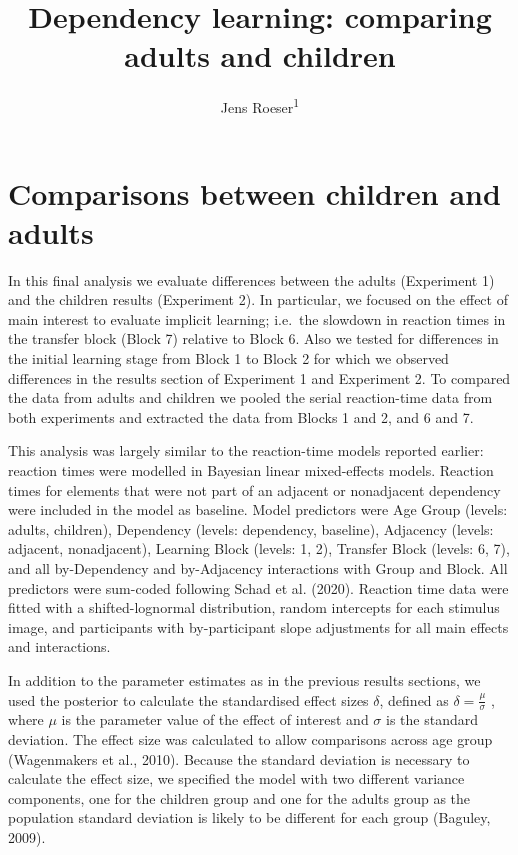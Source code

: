 \documentclass[
  english,
  man,floatsintext]{apa7}
\author{Jens Roeser\textsuperscript{1}}
\affiliation{
\vspace{0.5cm}
\textsuperscript{1} Department of Psychology, Nottingham Trent University, United Kingdom}
\title{Dependency learning: comparing adults and children}
\date{}
\begin{document}
\maketitle

\hypertarget{comparisons-between-children-and-adults}{%
\section{Comparisons between children and adults}\label{comparisons-between-children-and-adults}}

In this final analysis we evaluate differences between the adults (Experiment 1) and the children results (Experiment 2). In particular, we focused on the effect of main interest to evaluate implicit learning; i.e.~the slowdown in reaction times in the transfer block (Block 7) relative to Block 6. Also we tested for differences in the initial learning stage from Block 1 to Block 2 for which we observed differences in the results section of Experiment 1 and Experiment 2. To compared the data from adults and children we pooled the serial reaction-time data from both experiments and extracted the data from Blocks 1 and 2, and 6 and 7.

This analysis was largely similar to the reaction-time models reported earlier: reaction times were modelled in Bayesian linear mixed-effects models. Reaction times for elements that were not part of an adjacent or nonadjacent dependency were included in the model as baseline. Model predictors were Age Group (levels: adults, children), Dependency (levels: dependency, baseline), Adjacency (levels: adjacent, nonadjacent), Learning Block (levels: 1, 2), Transfer Block (levels: 6, 7), and all by-Dependency and by-Adjacency interactions with Group and Block. All predictors were sum-coded following Schad et al. (2020). Reaction time data were ﬁtted with a shifted-lognormal distribution, random intercepts for each stimulus image, and participants with by-participant slope adjustments for all main effects and interactions.

In addition to the parameter estimates as in the previous results sections, we used the posterior to calculate the standardised effect sizes \(\delta\), defined as \(\delta = \frac{\mu}{\sigma}\) , where \(\mu\) is the parameter value of the effect of interest and \(\sigma\) is the standard deviation. The effect size was calculated to allow comparisons across age group (Wagenmakers et al., 2010). Because the standard deviation is necessary to calculate the effect size, we specified the model with two different variance components, one for the children group and one for the adults group as the population standard deviation is likely to be different for each group (Baguley, 2009).
\end{document}
